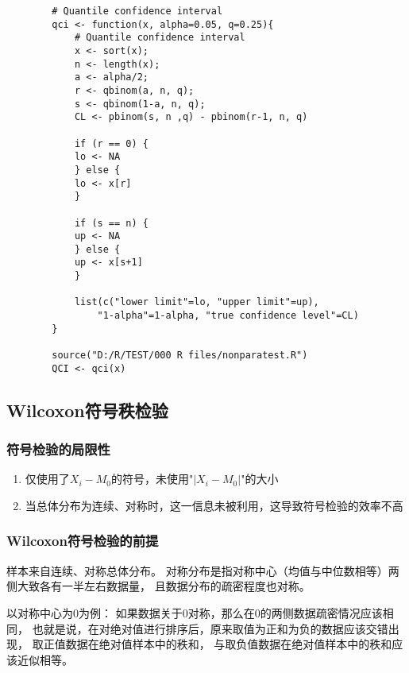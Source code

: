 \documentclass[UTF8]{ctexart}
\numberwithin{equation}{section}
\begin{document}
\begin{center}
    \begin{lstlisting}
        # Quantile confidence interval
        qci <- function(x, alpha=0.05, q=0.25){
            # Quantile confidence interval
            x <- sort(x);
            n <- length(x);
            a <- alpha/2;
            r <- qbinom(a, n, q);
            s <- qbinom(1-a, n, q);
            CL <- pbinom(s, n ,q) - pbinom(r-1, n, q)
            
            if (r == 0) {
            lo <- NA 
            } else {
            lo <- x[r]
            }
            
            if (s == n) {
            up <- NA 
            } else {
            up <- x[s+1]
            }
            
            list(c("lower limit"=lo, "upper limit"=up),
                "1-alpha"=1-alpha, "true confidence level"=CL)
        }

        source("D:/R/TEST/000 R files/nonparatest.R")
        QCI <- qci(x)
    \end{lstlisting}
\end{center}

\subsection{Wilcoxon符号秩检验}

\subsubsection{符号检验的局限性}

\begin{enumerate}
    \item 仅使用了$X_i - M_0$的符号，未使用"$|X_i - M_0|$"的大小
    \item 当总体分布为连续、对称时，这一信息未被利用，这导致符号检验的效率不高
\end{enumerate}

\subsubsection{Wilcoxon符号检验的前提}

样本来自连续、对称总体分布。
对称分布是指对称中心（均值与中位数相等）两侧大致各有一半左右数据量，
且数据分布的疏密程度也对称。

以对称中心为0为例：
如果数据关于0对称，那么在0的两侧数据疏密情况应该相同，
也就是说，在对绝对值进行排序后，原来取值为正和为负的数据应该交错出现，
取正值数据在绝对值样本中的秩和，
与取负值数据在绝对值样本中的秩和应该近似相等。
\end{document}
